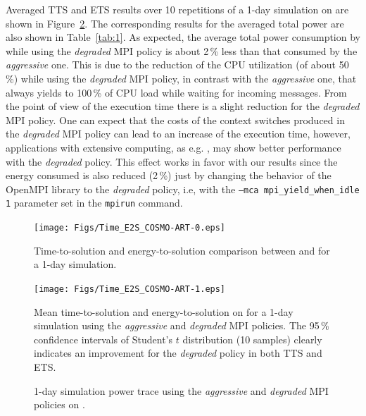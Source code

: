 Averaged TTS and ETS results  over 10 repetitions of a 1-day simulation on
\tinto are shown in  Figure~\ref{fig:4}. The corresponding results for
the  averaged total  power are  also shown  in  Table~\ref{tab:1}.  As
expected, the average total power consumption by \cosmoart while using
the \emph{degraded} MPI policy is about  2\,\% less than that consumed by the
\emph{aggressive} one. This is  due to  the reduction of the CPU utilization (of about 50\,\%) while using  the \emph{degraded} MPI policy, in
contrast with the \emph{aggressive} one, that always yields to 100\,\% of CPU load while waiting for incoming messages. From the point of  view of the execution time there is a
slight reduction  for the \emph{degraded} MPI  policy. One can  expect that the
costs of the context switches produced in the \emph{degraded} MPI policy can lead to
an  increase  of  the   execution  time,  however,  applications  with
extensive computing,  as e.g.  \cosmoart, may show  better performance
with the \emph{degraded} policy. This effect works in  favor with our results
since the energy consumed is also reduced (2\,\%) just by changing the
behavior of the OpenMPI library  to the \emph{degraded} policy, i.e, with the
\texttt{--mca    mpi\_yield\_when\_idle 1}   parameter   set    in   the
\texttt{mpirun} command.

\begin{figure}[ht]
  \centering
  \texttt{[image: Figs/Time\_E2S\_COSMO-ART-0.eps]}
  \caption{Time-to-solution and  energy-to-solution comparison between
    \pilat and \monch for a 1-day simulation.}
  \label{fig:3}
\end{figure}

\begin{figure}[ht]
  \centering
  \texttt{[image: Figs/Time\_E2S\_COSMO-ART-1.eps]}
  \vspace{-1cm}
  \caption{Mean time-to-solution and  energy-to-solution on \tinto for
    a 1-day simulation using the  \emph{aggressive} and \emph{degraded} MPI policies. The
    95\,\%  confidence  intervals of  Student's  $t$ distribution  (10
    samples) clearly  indicates an improvement for the \emph{degraded} policy in
    both TTS and ETS.}
  \label{fig:4}
\end{figure}

\begin{figure}[ht]
  \centering
  \hspace{0.8cm} \scalebox{0.62}{}
  \caption{1-day simulation power  trace  using  the \emph{aggressive}  and
    \emph{degraded} MPI policies on \tinto.}
  \label{fig:5}
\end{figure}

